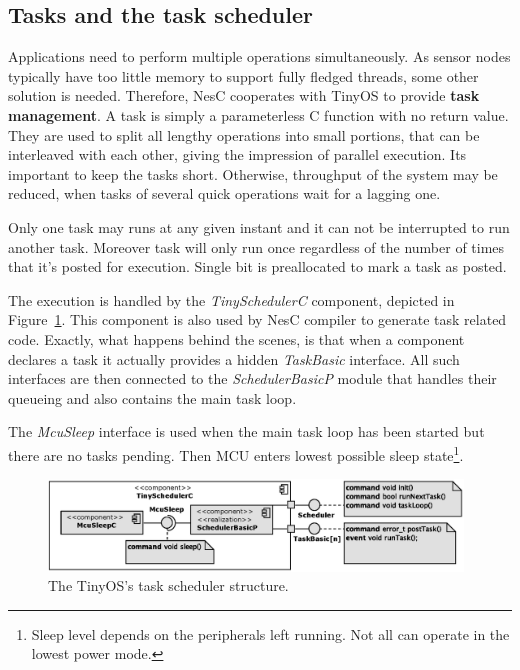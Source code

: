 \subsection{Tasks and the task scheduler}

Applications need to perform multiple operations simultaneously. As
sensor nodes typically have too little memory to support fully fledged
threads, some other solution is needed. Therefore, NesC cooperates with
TinyOS to provide {\bf task management}. A task is simply a
parameterless C function with no return value. They are used to split
all lengthy operations into small portions, that can be interleaved
with each other, giving the impression of parallel execution. Its
important to keep the tasks short. Otherwise, throughput of the system
may be reduced, when tasks of several quick operations wait for a
lagging one.

Only one task may runs at any given instant and it can not be
interrupted to run another task. Moreover task will only run once
regardless of the number of times that it's posted for execution.
Single bit is preallocated to mark a task as posted.

The execution is handled by the \emph{TinySchedulerC} component,
depicted in Figure~\ref{fig:tinyschedulerc}. This component is also
used by NesC compiler to generate task related code. Exactly, what
happens behind the scenes, is that when a component declares a task it
actually provides a hidden \emph{TaskBasic} interface. All such
interfaces are then connected to the \emph{SchedulerBasicP} module
that handles their queueing and also contains the main task loop.

The \emph{McuSleep} interface is used when the main task loop has been
started but there are no tasks pending. Then MCU enters lowest possible
sleep state\footnote{Sleep level depends on the peripherals left
running. Not all can operate in the lowest power mode.}.

\begin{figure}[h]
  \centering
  \includegraphics[width=0.98\textwidth]{diagrams/tinyschedulerc.eps}
  \caption{The TinyOS's task scheduler structure.}
  \label{fig:tinyschedulerc}
\end{figure}

